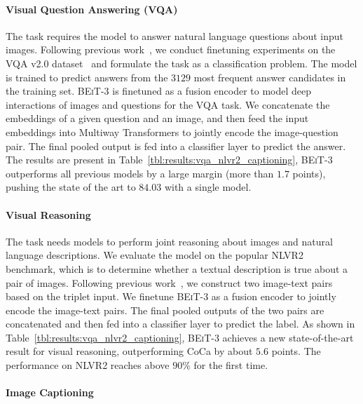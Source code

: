 \documentclass{article}
\newcommand\our{\textsc{BEiT-3}}
\newcommand\multiway{Multiway Transformers}
\begin{document}
\paragraph{Visual Question Answering (VQA)} 

The task requires the model to answer natural language questions about input images.
Following previous work~\citep{bottom_up_attn,vinvl,vilt}, we conduct finetuning experiments on the VQA v2.0 dataset~\citep{vqa} and formulate the task as a classification problem.
The model is trained to predict answers from the $3129$ most frequent answer candidates in the training set.
\our{} is finetuned as a fusion encoder to model deep interactions of images and questions for the VQA task.
We concatenate the embeddings of a given question and an image, and then feed the input embeddings into \multiway{} to jointly encode the image-question pair.
The final pooled output is fed into a classifier layer to predict the answer.
The results are present in Table~\ref{tbl:results:vqa_nlvr2_captioning}, \our{} outperforms all previous models by a large margin (more than $1.7$ points), pushing the state of the art to $84.03$ with a single model.

\paragraph{Visual Reasoning}
The task needs models to perform joint reasoning about images and natural language descriptions.
We evaluate the model on the popular NLVR2~\citep{nlvr2} benchmark, which is to determine whether a textual description is true about a pair of images.
Following previous work~\citep{vinvl,vilt}, we construct two image-text pairs based on the triplet input.
We finetune \our{} as a fusion encoder to jointly encode the image-text pairs.
The final pooled outputs of the two pairs are concatenated and then fed into a classifier layer to predict the label. 
As shown in Table~\ref{tbl:results:vqa_nlvr2_captioning}, \our{} achieves a new state-of-the-art result for visual reasoning, outperforming CoCa by about $5.6$ points. 
The performance on NLVR2 reaches above $90$\% for the first time.

\paragraph{Image Captioning}
\end{document}
